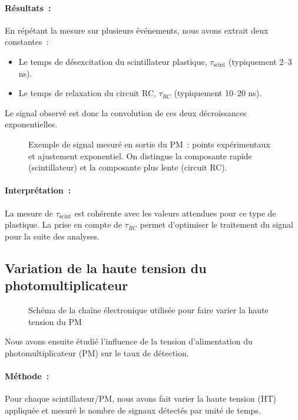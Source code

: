 \documentclass[a4paper,12pt,twoside]{article}
\begin{document}
\paragraph{Résultats :} En répétant la mesure sur plusieurs événements, nous avons extrait deux constantes :
\begin{itemize}
    \item Le temps de désexcitation du scintillateur plastique, $\tau_{\text{scint}}$ (typiquement 2–3 ns).
    \item Le temps de relaxation du circuit RC, $\tau_{RC}$ (typiquement 10–20 ns).
\end{itemize}
Le signal observé est donc la convolution de ces deux décroissances exponentielles.

\begin{figure}[H]
    \centering
    \caption{Exemple de signal mesuré en sortie du PM : points expérimentaux et ajustement exponentiel. On distingue la composante rapide (scintillateur) et la composante plus lente (circuit RC).}
\end{figure}

\paragraph{Interprétation :} La mesure de $\tau_{\text{scint}}$ est cohérente avec les valeurs attendues pour ce type de plastique. La prise en compte de $\tau_{RC}$ permet d’optimiser le traitement du signal pour la suite des analyses.

\subsection{Variation de la haute tension du photomultiplicateur}
\begin{figure}[H]
  \centering
  
  \caption{Schéma de la chaîne électronique utilisée pour faire varier la haute tension du PM}
  \label{fig:variation_HT}
\end{figure}

Nous avons ensuite étudié l’influence de la tension d’alimentation du photomultiplicateur (PM) sur le taux de détection.

\paragraph{Méthode :} Pour chaque scintillateur/PM, nous avons fait varier la haute tension (HT) appliquée et mesuré le nombre de signaux détectés par unité de temps.
\end{document}
